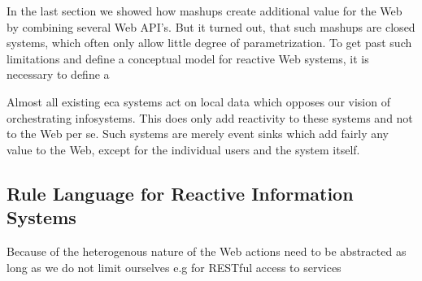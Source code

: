 








In the last section we showed how mashups create additional value for the Web by combining several Web API's.
But it turned out, that such mashups are closed systems, which often only allow little degree of parametrization.
To get past such limitations and define a conceptual model for reactive Web systems, it is necessary to define a 

Almost all existing \textrm{\acrshort{eca}} systems act on local data which opposes our vision of orchestrating \textrm{\glspl{infosystem}}.
This does only add reactivity to these systems and not to the Web per se.
Such systems are merely event sinks which add fairly any value to the Web, except for the individual users and the system itself.



\subsection{Rule Language for Reactive Information Systems}
Because of the heterogenous nature of the Web actions need to be abstracted
as long as we do not limit ourselves e.g for RESTful access to services






